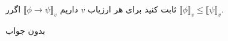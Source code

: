 ثابت کنید برای هر ارزیاب $v$ داریم
$\llbracket \phi\to\psi\rrbracket_v$
اگرر
$\llbracket\phi\rrbracket_v\leq\llbracket\psi\rrbracket_v$.
\begin{ans}
بدون جواب
\end{ans}
